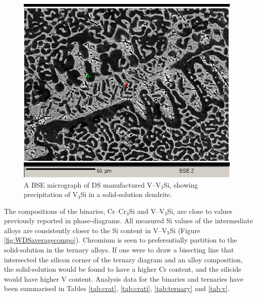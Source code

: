 %
%
\begin{figure}[H]
\begin{center}
\includegraphics[width=11cm]{location160vmirrorpointsbse}
\caption{A BSE micrograph of DS manufactured V--V$_3$Si, showing precipitation of V$_3$Si in a solid-solution dendrite.}
\label{fig:vdendritedecomposition}
\end{center}
\end{figure}
%

The compositions of the binaries, Cr--Cr$_3$Si and V--V$_3$Si, are close to values previously reported in phase-diagrams.  All measured Si values of the intermediate alloys are consistently closer to the Si content in V--V$_3$Si (Figure \ref{fig:WDSaveragecompo}).  Chromium is seen to preferentially partition to the solid-solution in the ternary alloys.  If one were to draw a bisecting line that intersected the silicon corner of the ternary diagram and an alloy composition, the solid-solution would be found to have a higher Cr content, and the silicide would have higher V content. Analysis data for the binaries and ternaries have been summarised in Tables \ref{tab:crat}, \ref{tab:crati}, \ref{tab:ternary} and \ref{tab:v}.


